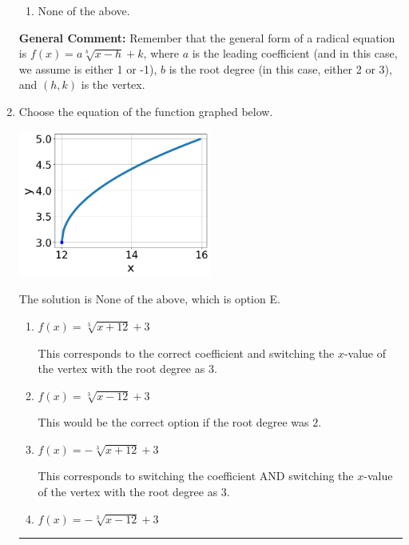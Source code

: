 \documentclass{extbook}[14pt]
\newcommand{\litem}[1]{\item #1

\rule{\textwidth}{0.4pt}}
\begin{document}
\begin{enumerate}
{\begin{enumerate}[label=\Alph*.]
\item None of the above.\end{enumerate}
\textbf{General Comment:} Remember that the general form of a radical equation is $ f(x) = a \sqrt[b]{x - h} + k $, where $a$ is the leading coefficient (and in this case, we assume is either 1 or -1), $b$ is the root degree (in this case, either 2 or 3), and $(h, k)$ is the vertex.
}
\litem{
Choose the equation of the function graphed below.

\begin{center}
    \includegraphics[width=0.5\textwidth]{../Figures/radicalGraphToEquationCopyC.png}
\end{center}



The solution is \( \text{None of the above} \), which is option E.\begin{enumerate}[label=\Alph*.]
\item \( f(x) = \sqrt[3]{x + 12} + 3 \)

This corresponds to the correct coefficient and switching the $x$-value of the vertex with the root degree as $3$.
\item \( f(x) = \sqrt[3]{x - 12} + 3 \)

This would be the correct option if the root degree was $2$.
\item \( f(x) = - \sqrt[3]{x + 12} + 3 \)

This corresponds to switching the coefficient AND switching the $x$-value of the vertex with the root degree as $3$.
\item \( f(x) = - \sqrt[3]{x - 12} + 3 \)


\end{enumerate}}
\end{enumerate}
\end{document}

